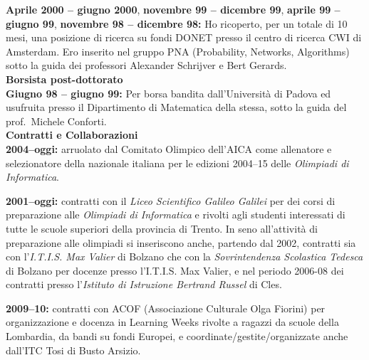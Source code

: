 \documentclass[10pt]{article}
\newcommand{\subvoice}[1] { {\large \bf #1} \smallskip\\ }
\begin{document}
\noindent
{\bf Aprile 2000 -- giugno 2000},
{\bf novembre 99 -- dicembre 99},
{\bf aprile 99 -- giugno 99},
{\bf novembre 98 -- dicembre 98:}
      Ho ricoperto, per un totale di 10 mesi,
      una posizione di ricerca su fondi DONET
      presso il centro di ricerca CWI di Amsterdam.
      Ero inserito nel gruppo PNA (Probability, Networks, Algorithms)
      sotto la guida dei professori Alexander Schrijver
      e Bert Gerards.\\

\subvoice{Borsista post-dottorato}
{\bf Giugno 98 -- giugno 99:}
Per borsa
bandita dall'Universit\`a di Padova
ed usufruita
presso il Dipartimento di Matematica 
della stessa,
sotto la guida del prof.~Michele Conforti.\\


\subvoice{Contratti e Collaborazioni}
{\bf 2004--oggi:} arruolato dal Comitato Olimpico dell'AICA
come allenatore e selezionatore
della nazionale italiana per le edizioni 2004--15
delle {\em Olimpiadi di Informatica}.

\noindent
{\bf 2001--oggi:}
contratti con il {\em Liceo Scientifico Galileo Galilei}
per dei corsi di preparazione alle {\em Olimpiadi di Informatica}
e rivolti agli studenti interessati
di tutte le scuole superiori della provincia di Trento.
In seno all'attivit\`a di preparazione alle olimpiadi
si inseriscono anche,
partendo dal 2002, contratti
sia con l'{\em I.T.I.S.
Max Valier} di Bolzano che
con la {\em Sovrintendenza Scolastica Tedesca} di Bolzano
per docenze presso l'I.T.I.S.
Max Valier,
e nel periodo 2006-08 dei contratti presso
l'{\em Istituto di Istruzione Bertrand Russel} di Cles.
%

\noindent
{\bf 2009--10:}
contratti con ACOF (Associazione Culturale Olga Fiorini)
per organizzazione e docenza
in Learning Weeks rivolte a ragazzi da scuole della Lombardia,
da bandi su fondi Europei,
e coordinate/gestite/organizzate anche dall'ITC Tosi di Busto Arsizio.
\end{document}
